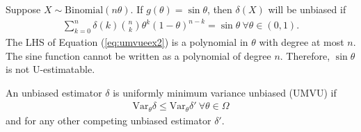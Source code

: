 \begin{example}
    Suppose $X\sim\text{Binomial}(n\theta)$. 
    If $g(\theta)=\sin\theta$, then $\delta(X)$ will be unbiased if 
    \begin{gather}
        \sum_{k=0}^n\delta(k)\binom{n}{k}\theta^k(1-\theta)^{n-k}=\sin\theta~\forall{\theta}\in(0,1).\label{eq:umvueex2}
    \end{gather}
    The LHS of Equation (\ref{eq:umvueex2}) is a polynomial in $\theta$ with degree at most $n$.
    The sine function cannot be written as a polynomial of degree $n$.
    Therefore, $\sin\theta$is not U-estimatable.
\end{example}

\begin{definition}[UMVU]
    An unbiased estimator $\delta$ is uniformly minimum variance unbiased (UMVU) if 
    \begin{gather}
        \mathrm{Var}_\theta \delta\leq \mathrm{Var}_\theta\delta'~\forall\theta\in\Omega
    \end{gather}
    and for any other competing unbiased estimator $\delta'$.
\end{definition}

